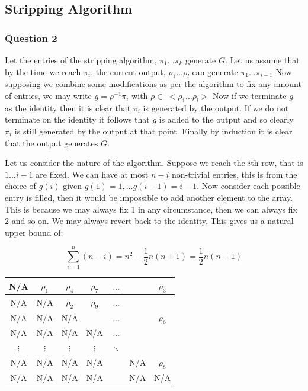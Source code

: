 \documentclass{article}
\begin{document}
\subsection{Stripping Algorithm}

\subsubsection{Question 2}

Let the entries of the stripping algorithm, $\pi_1 \dots \pi_k$ generate $G$.
Let us assume that by the time we reach $\pi_i$, the current output, $\rho_1 \dots \rho_l$ can generate $\pi_1 \dots \pi_{i-1}$
Now supposing we combine some modifications as per the algorithm to fix any amount of entries, we may write $g = \rho^{-1}\pi_i$ with $\rho \in\ <\rho_1 \dots \rho_l>$
Now if we terminate $g$ as the identity then it is clear that $\pi_i$ is generated by the output. If we do not terminate on the identity
it follows that $g$ is added to the output and so clearly $\pi_i$ is still generated by the output at that point. Finally by induction it is clear that the output generates $G$.

\vspace*{5mm}

Let us consider the nature of the algorithm. Suppose we reach the $i$th row, that is $1 \dots i-1$ are fixed. We can have at most $n-i$ non-trivial entries,
this is from the choice of $g(i)$ given $g(1) = 1, \dots g(i-1) = i-1$. Now consider each possible entry is filled, then it would be impossible to add another element to the array.
This is because we may always fix 1 in any circumstance, then we can always fix 2 and so on. We may always revert back to the identity. This gives us a natural upper bound of:

$$\sum_{i = 1}^{n}(n-i) = n^2 - \frac{1}{2}n(n+1) = \frac{1}{2}n(n-1)$$

\begin{table}[h!]
	\centering
	\begin{tabular}{ |c|c|c|c c c|c| }
		\hline
		N/A      & $\rho_1$ & $\rho_4$ & $\rho_7$ & $\dots$  &     & $\rho_3$ \\ \hline
		N/A      & N/A      & $\rho_2$ & $\rho_9$ & $\dots$  &     &          \\ \hline
		N/A      & N/A      & N/A      &          & $\dots$  &     & $\rho_6$ \\ \hline
		N/A      & N/A      & N/A      & N/A      & $\dots$  &     &          \\
		$\vdots$ & $\vdots$ & $\vdots$ & $\vdots$ & $\ddots$ &     &          \\
		N/A      & N/A      & N/A      & N/A      &          & N/A & $\rho_8$ \\ \hline
		N/A      & N/A      & N/A      & N/A      &          & N/A & N/A      \\ \hline
	\end{tabular}
\end{table}
\end{document}

